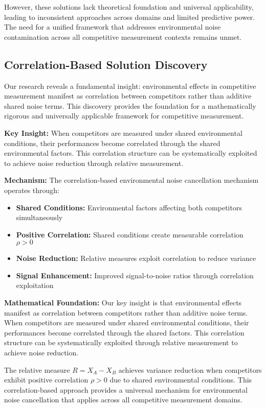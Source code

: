 However, these solutions lack theoretical foundation and universal applicability, leading to inconsistent approaches across domains and limited predictive power. The need for a unified framework that addresses environmental noise contamination across all competitive measurement contexts remains unmet.

\subsection{Correlation-Based Solution Discovery}

Our research reveals a fundamental insight: environmental effects in competitive measurement manifest as correlation between competitors rather than additive shared noise terms. This discovery provides the foundation for a mathematically rigorous and universally applicable framework for competitive measurement.

\textbf{Key Insight:}
When competitors are measured under shared environmental conditions, their performances become correlated through the shared environmental factors. This correlation structure can be systematically exploited to achieve noise reduction through relative measurement.

\textbf{Mechanism:}
The correlation-based environmental noise cancellation mechanism operates through:
\begin{itemize}
    \item \textbf{Shared Conditions:} Environmental factors affecting both competitors simultaneously
    \item \textbf{Positive Correlation:} Shared conditions create measurable correlation $\rho > 0$
    \item \textbf{Noise Reduction:} Relative measures exploit correlation to reduce variance
    \item \textbf{Signal Enhancement:} Improved signal-to-noise ratios through correlation exploitation
\end{itemize}

\textbf{Mathematical Foundation:}
Our key insight is that environmental effects manifest as correlation between competitors rather than additive noise terms. When competitors are measured under shared environmental conditions, their performances become correlated through the shared factors. This correlation structure can be systematically exploited through relative measurement to achieve noise reduction.

The relative measure $R = X_A - X_B$ achieves variance reduction when competitors exhibit positive correlation $\rho > 0$ due to shared environmental conditions. This correlation-based approach provides a universal mechanism for environmental noise cancellation that applies across all competitive measurement domains.

